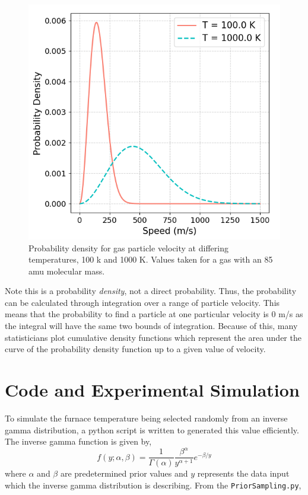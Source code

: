\documentclass[%
 reprint,
 amsmath,amssymb,
 aps,
]{revtex4-2}
\begin{document}
\begin{figure}[H]
	\caption{Probability density for gas particle velocity at differing temperatures, 100 k and 1000 K. Values taken for a gas with an 85 amu molecular mass. }
	\centering
	\includegraphics[scale=0.51]{hypothesis1.png}
\end{figure}

Note this is a probability \textit{density}, not a direct probability. Thus, the probability can be calculated through integration over a range of particle velocity. This means that the probability to find a particle at one particular velocity is 0 m/s as the integral will have the same two bounds of integration. Because of this, many statisticians plot cumulative density functions which represent the area under the curve of the probability density function up to a given value of velocity.

\section{Code and Experimental Simulation}

To simulate the furnace temperature being selected randomly from an inverse gamma distribution, a python script is written to generated this value efficiently. The inverse gamma function is given by,
\[
	f(y; \alpha, \beta) = \frac{1}{\Gamma(\alpha)} \frac{\beta^\alpha}{y^{\alpha + 1}} e^{-\beta/y}
\]
where $\alpha$ and $\beta$ are predetermined prior values and $y$ represents the data input which the inverse gamma distribution is describing.
From the \lstinline{PriorSampling.py},
\end{document}
